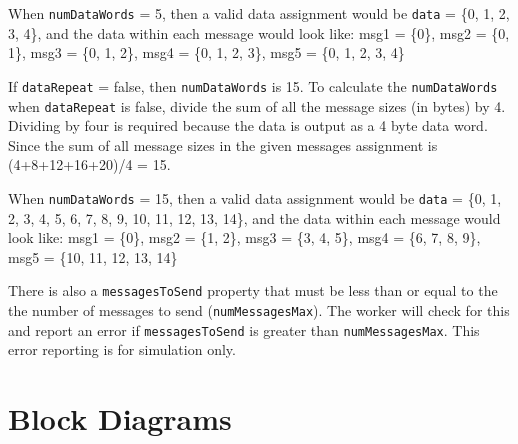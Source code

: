 \documentclass{article}
\begin{document}
\begin{flushleft}
When \texttt{numDataWords} = 5, then a valid data assignment would be \texttt{data} = \{0, 1, 2, 3, 4\}, and the data within each message would look like:
msg1 = \{0\}, msg2 = \{0, 1\}, msg3 = \{0, 1, 2\}, msg4 = \{0, 1, 2, 3\}, msg5 = \{0, 1, 2, 3, 4\}  \newline

If \texttt{dataRepeat} = false, then \texttt{numDataWords} is 15. To calculate the \texttt{numDataWords} when \texttt{dataRepeat} is false, divide the sum of all the message sizes (in bytes) by 4. Dividing by four is required because the data is output as a 4 byte data word. Since the sum of all message sizes in the given messages assignment is (4+8+12+16+20)/4 = 15. \newline

When \texttt{numDataWords} = 15, then a valid data assignment would be \texttt{data} = \{0, 1, 2, 3, 4, 5, 6, 7, 8, 9, 10, 11, 12, 13, 14\}, and the data within each message would look like: msg1 = \{0\}, msg2 = \{1, 2\}, msg3 = \{3, 4, 5\}, msg4 = \{6, 7, 8, 9\}, msg5 = \{10, 11, 12, 13, 14\}  \newline

There is also a \texttt{messagesToSend} property that must be less than or equal to the the number of messages to send (\texttt{numMessagesMax}). The worker will check for this and report an error if \texttt{messagesToSend} is greater than \texttt{numMessagesMax}. This error reporting is for simulation only.  \newline

\end{flushleft}

\section*{Block Diagrams}
\end{document}
